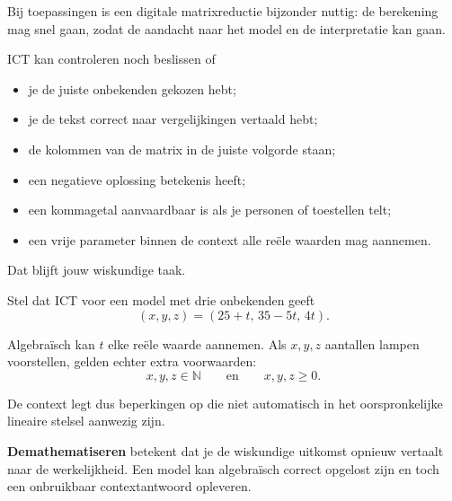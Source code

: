 \documentclass{ximera}
\begin{document}


Bij toepassingen is een digitale matrixreductie bijzonder nuttig:
de berekening mag snel gaan, zodat de aandacht naar het model en de
interpretatie kan gaan.

\begin{opmerking}
ICT kan controleren noch beslissen of
\begin{itemize}
  \item je de juiste onbekenden gekozen hebt;
  \item je de tekst correct naar vergelijkingen vertaald hebt;
  \item de kolommen van de matrix in de juiste volgorde staan;
  \item een negatieve oplossing betekenis heeft;
  \item een kommagetal aanvaardbaar is als je personen of toestellen telt;
  \item een vrije parameter binnen de context alle reële waarden mag aannemen.
\end{itemize}
Dat blijft jouw wiskundige taak.
\end{opmerking}


Stel dat ICT voor een model met drie onbekenden geeft
\[
(x,y,z)=(25+t,\,35-5t,\,4t).
\]

Algebraïsch kan \(t\) elke reële waarde aannemen. Als \(x,y,z\) aantallen
lampen voorstellen, gelden echter extra voorwaarden:
\[
x,y,z\in\mathbb{N}
\qquad\text{en}\qquad
x,y,z\geq0.
\]

De context legt dus beperkingen op die niet automatisch in het oorspronkelijke
lineaire stelsel aanwezig zijn.

\begin{opmerking}
\textbf{Demathematiseren} betekent dat je de wiskundige uitkomst opnieuw
vertaalt naar de werkelijkheid. Een model kan algebraïsch correct opgelost
zijn en toch een onbruikbaar contextantwoord opleveren.
\end{opmerking}


\end{document}

